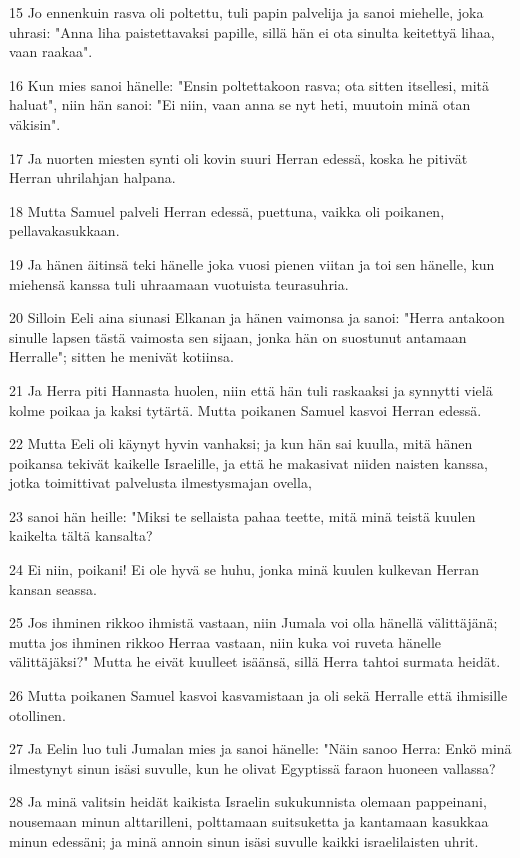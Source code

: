 \par 15 Jo ennenkuin rasva oli poltettu, tuli papin palvelija ja sanoi miehelle, joka uhrasi: "Anna liha paistettavaksi papille, sillä hän ei ota sinulta keitettyä lihaa, vaan raakaa".
\par 16 Kun mies sanoi hänelle: "Ensin poltettakoon rasva; ota sitten itsellesi, mitä haluat", niin hän sanoi: "Ei niin, vaan anna se nyt heti, muutoin minä otan väkisin".
\par 17 Ja nuorten miesten synti oli kovin suuri Herran edessä, koska he pitivät Herran uhrilahjan halpana.
\par 18 Mutta Samuel palveli Herran edessä, puettuna, vaikka oli poikanen, pellavakasukkaan.
\par 19 Ja hänen äitinsä teki hänelle joka vuosi pienen viitan ja toi sen hänelle, kun miehensä kanssa tuli uhraamaan vuotuista teurasuhria.
\par 20 Silloin Eeli aina siunasi Elkanan ja hänen vaimonsa ja sanoi: "Herra antakoon sinulle lapsen tästä vaimosta sen sijaan, jonka hän on suostunut antamaan Herralle"; sitten he menivät kotiinsa.
\par 21 Ja Herra piti Hannasta huolen, niin että hän tuli raskaaksi ja synnytti vielä kolme poikaa ja kaksi tytärtä. Mutta poikanen Samuel kasvoi Herran edessä.
\par 22 Mutta Eeli oli käynyt hyvin vanhaksi; ja kun hän sai kuulla, mitä hänen poikansa tekivät kaikelle Israelille, ja että he makasivat niiden naisten kanssa, jotka toimittivat palvelusta ilmestysmajan ovella,
\par 23 sanoi hän heille: "Miksi te sellaista pahaa teette, mitä minä teistä kuulen kaikelta tältä kansalta?
\par 24 Ei niin, poikani! Ei ole hyvä se huhu, jonka minä kuulen kulkevan Herran kansan seassa.
\par 25 Jos ihminen rikkoo ihmistä vastaan, niin Jumala voi olla hänellä välittäjänä; mutta jos ihminen rikkoo Herraa vastaan, niin kuka voi ruveta hänelle välittäjäksi?" Mutta he eivät kuulleet isäänsä, sillä Herra tahtoi surmata heidät.
\par 26 Mutta poikanen Samuel kasvoi kasvamistaan ja oli sekä Herralle että ihmisille otollinen.
\par 27 Ja Eelin luo tuli Jumalan mies ja sanoi hänelle: "Näin sanoo Herra: Enkö minä ilmestynyt sinun isäsi suvulle, kun he olivat Egyptissä faraon huoneen vallassa?
\par 28 Ja minä valitsin heidät kaikista Israelin sukukunnista olemaan pappeinani, nousemaan minun alttarilleni, polttamaan suitsuketta ja kantamaan kasukkaa minun edessäni; ja minä annoin sinun isäsi suvulle kaikki israelilaisten uhrit.
